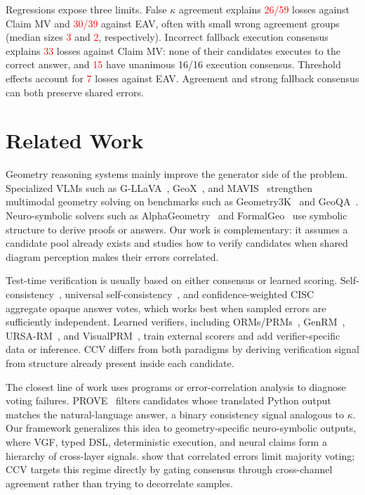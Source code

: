 \documentclass{article}
\newcommand{\ccv}{\textsc{CCV}}
\newcommand{\recheck}[1]{\textcolor{red}{#1}}
\begin{document}
Regressions expose three limits. False $\kappa$ agreement explains \recheck{26/59} losses against Claim MV and \recheck{30/39} against EAV, often with small wrong agreement groups (median sizes \recheck{3} and \recheck{2}, respectively). Incorrect fallback execution consensus explains \recheck{33} losses against Claim MV: none of their candidates executes to the correct answer, and \recheck{15} have unanimous 16/16 execution consensus. Threshold effects account for \recheck{7} losses against EAV. Agreement and strong fallback consensus can both preserve shared errors.

\section{Related Work}
\label{sec:related}

Geometry reasoning systems mainly improve the generator side of the problem. Specialized VLMs such as G-LLaVA~\citep{gao2023g}, GeoX~\citep{xia2024geox}, and MAVIS~\citep{zhang2024mavis} strengthen multimodal geometry solving on benchmarks such as Geometry3K~\citep{lu2021inter} and GeoQA~\citep{chen2021geoqa}. Neuro-symbolic solvers such as AlphaGeometry~\citep{trinh2024solving,chervonyi2025gold} and FormalGeo~\citep{zhang2023formalgeo} use symbolic structure to derive proofs or answers. Our work is complementary: it assumes a candidate pool already exists and studies how to verify candidates when shared diagram perception makes their errors correlated.

Test-time verification is usually based on either consensus or learned scoring. Self-consistency~\citep{wang2022self}, universal self-consistency~\citep{chen2023universal}, and confidence-weighted CISC~\citep{taubenfeld2025confidence} aggregate opaque answer votes, which works best when sampled errors are sufficiently independent. Learned verifiers, including ORMs/PRMs~\citep{cobbe2021training,uesato2022solving,lightman2023let,wang2024math}, GenRM~\citep{zhang2024generative}, URSA-RM~\citep{luo2025ursa}, and VisualPRM~\citep{wang2025visualprm}, train external scorers and add verifier-specific data or inference. \ccv{} differs from both paradigms by deriving verification signal from structure already present inside each candidate.

The closest line of work uses programs or error-correlation analysis to diagnose voting failures. PROVE~\citep{toh2024not} filters candidates whose translated Python output matches the natural-language answer, a binary consistency signal analogous to $\kappa$. Our framework generalizes this idea to geometry-specific neuro-symbolic outputs, where VGF, typed DSL, deterministic execution, and neural claims form a hierarchy of cross-layer signals. \citet{nitarach2026model} show that correlated errors limit majority voting; \ccv{} targets this regime directly by gating consensus through cross-channel agreement rather than trying to decorrelate samples.
\end{document}
